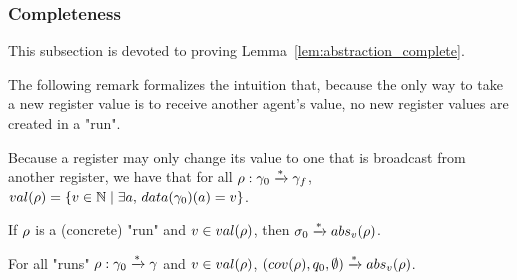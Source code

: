 \subsubsection{Completeness}
\label{one-completeness}

This subsection is devoted to proving Lemma~\ref{lem:abstraction_complete}.


The following remark formalizes the intuition that, because the only way to take a new register value is to receive another agent's value, no new register values are created in a "run".
\begin{remark}
	\label{rem:run_no_new_register_values}
	Because a register may only change its value to one that is broadcast from another register, we have that for all $\rho: \gamma_0 \xrightarrow{*} \gamma_f$, $\valsof{\run} = \set{\aval \in \nats \mid \exists a, \, \data{\config_0}(a) = \aval}$.
\end{remark}

\begin{lemma}
	\label{lem:abstraction_complete}
	If $\rho$ is a (concrete) "run" and $\aval \in \valsof{\run}$, then $\aconfiginit \step{*} \absproj{\aval}{\run}$. 
\end{lemma}



\begin{lemma}
	\label{lem:proof_completeness_covset_constant}
	For all "runs" $\rho: \gamma_0 \xrightarrow{*} \gamma$ and $\aval \in \valsof{\run}$, $(\statesin{\run}, q_0, \emptyset) \step{*} \absproj{\aval}{\run}$. 
\end{lemma}

